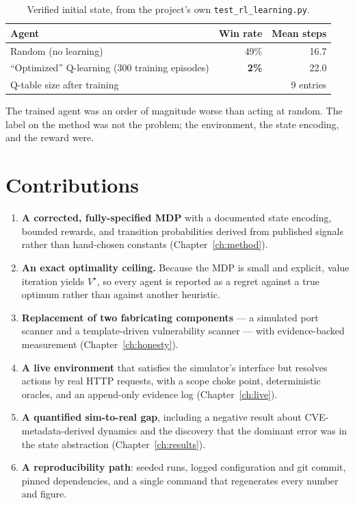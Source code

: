 \documentclass[11pt,a4paper]{report}
\newcommand{\code}[1]{\texttt{\small #1}}
\begin{document}
\begin{table}[h]
\centering
\caption{Verified initial state, from the project's own \code{test\_rl\_learning.py}.}
\label{tab:before}
\begin{tabular}{lrr}
\toprule
\textbf{Agent} & \textbf{Win rate} & \textbf{Mean steps} \\
\midrule
Random (no learning) & 49\% & 16.7 \\
``Optimized'' Q-learning (300 training episodes) & \textcolor{accent}{\textbf{2\%}} & 22.0 \\
\midrule
Q-table size after training & \multicolumn{2}{r}{9 entries} \\
\bottomrule
\end{tabular}
\end{table}

The trained agent was an order of magnitude worse than acting at random. The
label on the method was not the problem; the environment, the state encoding,
and the reward were.

\section{Contributions}
\begin{enumerate}[leftmargin=*]
  \item \textbf{A corrected, fully-specified MDP} with a documented state
  encoding, bounded rewards, and transition probabilities derived from published
  signals rather than hand-chosen constants (Chapter~\ref{ch:method}).
  \item \textbf{An exact optimality ceiling.} Because the MDP is small and
  explicit, value iteration yields $V^\star$, so every agent is reported as a
  regret against a true optimum rather than against another heuristic.
  \item \textbf{Replacement of two fabricating components} --- a simulated port
  scanner and a template-driven vulnerability scanner --- with evidence-backed
  measurement (Chapter~\ref{ch:honesty}).
  \item \textbf{A live environment} that satisfies the simulator's interface but
  resolves actions by real HTTP requests, with a scope choke point, deterministic
  oracles, and an append-only evidence log (Chapter~\ref{ch:live}).
  \item \textbf{A quantified sim-to-real gap}, including a negative result about
  CVE-metadata-derived dynamics and the discovery that the dominant error was in
  the state abstraction (Chapter~\ref{ch:results}).
  \item \textbf{A reproducibility path}: seeded runs, logged configuration and
  git commit, pinned dependencies, and a single command that regenerates every
  number and figure.
\end{enumerate}
\end{document}
